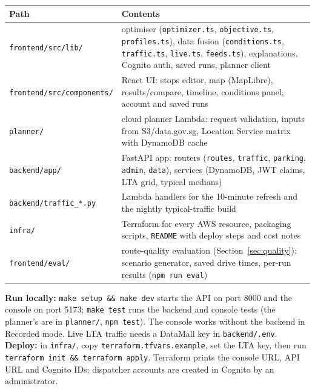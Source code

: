 \documentclass[10.5pt,a4paper]{article}
\begin{document}
\begin{table}[h]
\centering\footnotesize
\begin{tabularx}{\linewidth}{@{}p{3.6cm}Y@{}}
\toprule
\textbf{Path} & \textbf{Contents} \\
\midrule
\texttt{frontend/src/lib/} & optimiser (\texttt{optimizer.ts}, \texttt{objective.ts}, \texttt{profiles.ts}), data fusion (\texttt{conditions.ts}, \texttt{traffic.ts}, \texttt{live.ts}, \texttt{feeds.ts}), explanations, Cognito auth, saved runs, planner client \\
\texttt{frontend/src/components/} & React UI: stops editor, map (MapLibre), results/compare, timeline, conditions panel, account and saved runs \\
\texttt{planner/} & cloud planner Lambda: request validation, inputs from S3/data.gov.sg, Location Service matrix with DynamoDB cache \\
\texttt{backend/app/} & FastAPI app: routers (\texttt{routes}, \texttt{traffic}, \texttt{parking}, \texttt{admin}, \texttt{data}), services (DynamoDB, JWT claims, LTA grid, typical medians) \\
\texttt{backend/traffic\_*.py} & Lambda handlers for the 10-minute refresh and the nightly typical-traffic build \\
\texttt{infra/} & Terraform for every AWS resource, packaging scripts, \texttt{README} with deploy steps and cost notes \\
\texttt{frontend/eval/} & route-quality evaluation (Section~\ref{sec:quality}): scenario generator, saved drive times, per-run results (\texttt{npm run eval}) \\
\bottomrule
\end{tabularx}
\end{table}

\textbf{Run locally:} \texttt{make setup \&\& make dev} starts the API on port 8000 and the console on port 5173; \texttt{make test}
runs the backend and console tests (the planner's are in \texttt{planner/}, \texttt{npm test}). The console works without the backend in Recorded mode. Live LTA traffic needs a DataMall key in
\texttt{backend/.env}. \textbf{Deploy:} in \texttt{infra/}, copy \texttt{terraform.tfvars.example}, set the LTA key, then run
\texttt{terraform init \&\& terraform apply}. Terraform prints the console URL, API URL and Cognito IDs; dispatcher accounts
are created in Cognito by an administrator.

\end{document}
